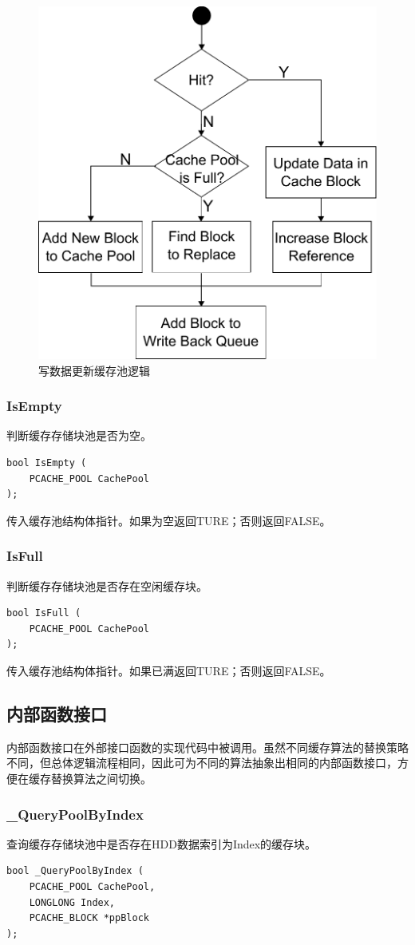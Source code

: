 \begin{figure}[!ht]
\centering
\includegraphics[width=0.6\linewidth]{./graph/write-update-pool}
\caption{写数据更新缓存池逻辑}
\label{fig:write-update-pool}
\end{figure}

\subsubsection{IsEmpty}
判断缓存存储块池是否为空。
\begin{lstlisting}
bool IsEmpty (
    PCACHE_POOL CachePool
);
\end{lstlisting}

传入缓存池结构体指针。如果为空返回TURE；否则返回FALSE。

\subsubsection{IsFull}
判断缓存存储块池是否存在空闲缓存块。
\begin{lstlisting}
bool IsFull (
    PCACHE_POOL CachePool
);
\end{lstlisting}

传入缓存池结构体指针。如果已满返回TURE；否则返回FALSE。

\subsection{内部函数接口}

内部函数接口在外部接口函数的实现代码中被调用。虽然不同缓存算法的替换策略不同，但总体逻辑流程相同，因此可为不同的算法抽象出相同的内部函数接口，方便在缓存替换算法之间切换。

\subsubsection{\_QueryPoolByIndex}
查询缓存存储块池中是否存在HDD数据索引为Index的缓存块。
\begin{lstlisting}
bool _QueryPoolByIndex (
    PCACHE_POOL CachePool,
    LONGLONG Index,
    PCACHE_BLOCK *ppBlock
);
\end{lstlisting}

